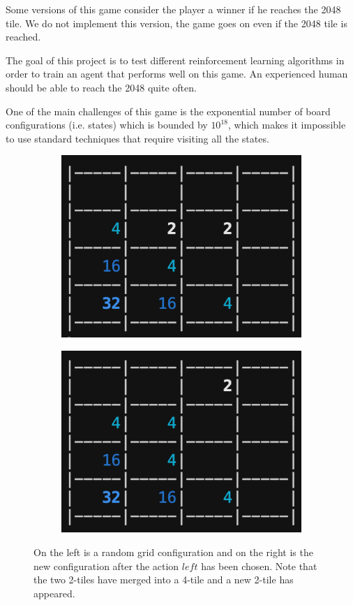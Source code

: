 \documentclass[journal, a4paper]{IEEEtran}
\newcommand\todo[1]{\textcolor{red}{#1}}
\begin{document}
Some versions of this game consider the player a winner if he reaches the 2048 tile. We do not implement this version, the game goes on even if the 2048 tile is reached.

The goal of this project is to test different reinforcement learning algorithms in order to train an agent that performs well on this game. An experienced human should be able to reach the 2048 quite often.

One of the main challenges of this game is the exponential number of board configurations (i.e. states) which is bounded by $10^{18}$, which makes it impossible to use standard techniques that require visiting all the states.

\begin{figure}[ht]
	\centering
	\begin{subfigure}
        \centering
        \includegraphics[width=.4\linewidth]{report/images/2048_board_1.png}
        \label{fig:sub1}
    \end{subfigure}%
    \begin{subfigure}
      \centering
      \includegraphics[width=.4\linewidth]{report/images/2048_board_2.png}
      \label{fig:sub2}
    \end{subfigure}
    \caption{On the left is a random grid configuration and on the right is the new configuration after the action $left$ has been chosen. Note that the two 2-tiles have merged into a 4-tile and a new 2-tile has appeared.}
\end{figure}
\end{document}
